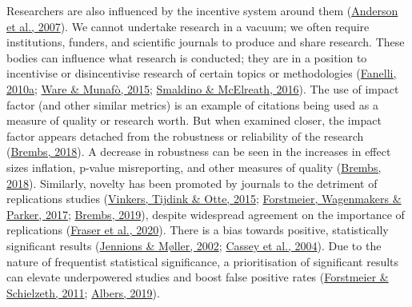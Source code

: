 \documentclass[10pt,a4paper]{article}
\begin{document}
Researchers are also influenced by the incentive system around them (\protect\hyperlink{ref-anderson_perverse_2007}{Anderson et al., 2007}).
We cannot undertake research in a vacuum; we often require institutions, funders, and scientific journals to produce and share research.
These bodies can influence what research is conducted; they are in a position to incentivise or disincentivise research of certain topics or methodologies (\protect\hyperlink{ref-fanelli_pressures_2010}{Fanelli, 2010a}; \protect\hyperlink{ref-ware_significance_2015}{Ware \& Munafò, 2015}; \protect\hyperlink{ref-smaldino_natural_2016}{Smaldino \& McElreath, 2016}).
The use of impact factor (and other similar metrics) is an example of citations being used as a measure of quality or research worth.
But when examined closer, the impact factor appears detached from the robustness or reliability of the research (\protect\hyperlink{ref-Brembs2018}{Brembs, 2018}).
A decrease in robustness can be seen in the increases in effect sizes inflation, p-value misreporting, and other measures of quality (\protect\hyperlink{ref-Brembs2018}{Brembs, 2018}).
Similarly, novelty has been promoted by journals to the detriment of replications studies (\protect\hyperlink{ref-vinkers_use_2015}{Vinkers, Tijdink \& Otte, 2015}; \protect\hyperlink{ref-forstmeier_detecting_2017}{Forstmeier, Wagenmakers \& Parker, 2017}; \protect\hyperlink{ref-brembs_reliable_2019}{Brembs, 2019}), despite widespread agreement on the importance of replications (\protect\hyperlink{ref-fraser_role_2020}{Fraser et al., 2020}).
There is a bias towards positive, statistically significant results (\protect\hyperlink{ref-jennions_publication_2002}{Jennions \& Møller, 2002}; \protect\hyperlink{ref-cassey_survey_2004}{Cassey et al., 2004}).
Due to the nature of frequentist statistical significance, a prioritisation of significant results can elevate underpowered studies and boost false positive rates (\protect\hyperlink{ref-forstmeier_cryptic_2011}{Forstmeier \& Schielzeth, 2011}; \protect\hyperlink{ref-albers_problem_2019}{Albers, 2019}).
\end{document}
